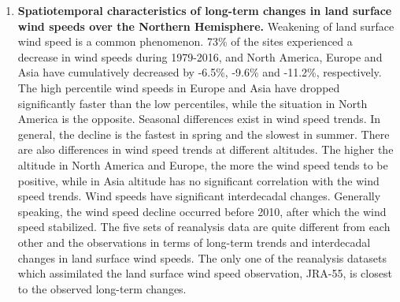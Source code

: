 \begin{enumerate}

\item  \textbf{Spatiotemporal characteristics of long-term changes in land surface wind speeds over the Northern Hemisphere.} Weakening of land surface wind speed is a common phenomenon. 73\% of the sites experienced a decrease in wind speeds during 1979-2016, and North America, Europe and Asia have cumulatively decreased by -6.5\%, -9.6\% and -11.2\%, respectively. The high percentile wind speeds in Europe and Asia have dropped significantly faster than the low percentiles, while the situation in North America is the opposite. Seasonal differences exist in wind speed trends. In general, the decline is the fastest in spring and the slowest in summer. There are also differences in wind speed trends at different altitudes. The higher the altitude in North America and Europe, the more the wind speed tends to be positive, while in Asia altitude has no significant correlation with the wind speed trends. Wind speeds have significant interdecadal changes. Generally speaking, the wind speed decline occurred before 2010, after which the wind speed stabilized. The five sets of reanalysis data are quite different from each other and the observations in terms of long-term trends and interdecadal changes in land surface wind speeds. The only one of the reanalysis datasets which assimilated the land surface wind speed observation, JRA-55, is closest to the observed long-term changes.


\end{enumerate}
